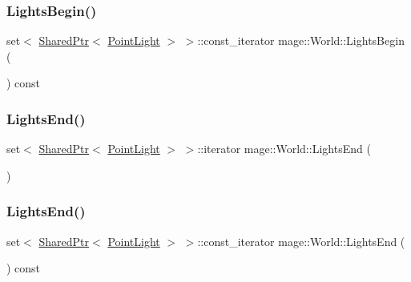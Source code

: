 \hypertarget{classmage_1_1_world_a45b3876de39fd5d7bd176f029cf4c535}{}\label{classmage_1_1_world_a45b3876de39fd5d7bd176f029cf4c535} 
\subsubsection{\texorpdfstring{Lights\+Begin()}{LightsBegin()}\hspace{0.1cm}{\footnotesize\ttfamily [2/2]}}
{\footnotesize\ttfamily set$<$ \hyperlink{namespacemage_a1e01ae66713838a7a67d30e44c67703e}{Shared\+Ptr}$<$ \hyperlink{structmage_1_1_point_light}{Point\+Light} $>$ $>$\+::const\+\_\+iterator mage\+::\+World\+::\+Lights\+Begin (\begin{DoxyParamCaption}{ }\end{DoxyParamCaption}) const}

\hypertarget{classmage_1_1_world_a52c035bf11269bb9cc6fb537532bfeab}{}\label{classmage_1_1_world_a52c035bf11269bb9cc6fb537532bfeab} 
\subsubsection{\texorpdfstring{Lights\+End()}{LightsEnd()}\hspace{0.1cm}{\footnotesize\ttfamily [1/2]}}
{\footnotesize\ttfamily set$<$ \hyperlink{namespacemage_a1e01ae66713838a7a67d30e44c67703e}{Shared\+Ptr}$<$ \hyperlink{structmage_1_1_point_light}{Point\+Light} $>$ $>$\+::iterator mage\+::\+World\+::\+Lights\+End (\begin{DoxyParamCaption}{ }\end{DoxyParamCaption})}

\hypertarget{classmage_1_1_world_a752ce259cdcffdfba51e2c9e480d2ddc}{}\label{classmage_1_1_world_a752ce259cdcffdfba51e2c9e480d2ddc} 
\subsubsection{\texorpdfstring{Lights\+End()}{LightsEnd()}\hspace{0.1cm}{\footnotesize\ttfamily [2/2]}}
{\footnotesize\ttfamily set$<$ \hyperlink{namespacemage_a1e01ae66713838a7a67d30e44c67703e}{Shared\+Ptr}$<$ \hyperlink{structmage_1_1_point_light}{Point\+Light} $>$ $>$\+::const\+\_\+iterator mage\+::\+World\+::\+Lights\+End (\begin{DoxyParamCaption}{ }\end{DoxyParamCaption}) const}

